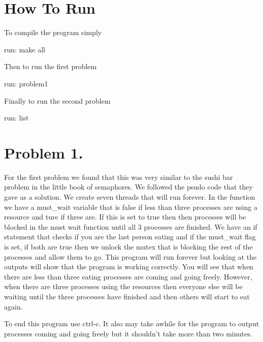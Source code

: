\documentclass[letterpaper,10pt,titlepage]{article}
\begin{document}
\section{How To Run} To compile the program simply 

run: make all

Then to run the first problem 

run: problem1

Finally to run the second problem 

run: list

\section{Problem 1.} For the first problem we found that this was very similar 
to the sushi bar problem in the little book of semaphores. We followed the 
psudo code that they gave as a solution. We create seven threads that will 
run forever. In the function we have a must\_wait variable that is false if 
less than three processes are using a resource and ture if three are. If this is set to 
true then then processes will be blocked in the must wait function until all 3 processes 
are finished. We have an if statement that checks if you are the last person 
eating and if the must\_wait flag is set, if both are true then we unlock the 
mutex that is blocking the rest of the processes and allow them to go. This 
program will run forever but looking at the outputs will show that the 
program is working correctly. You will see that when there are less than 
three eating processes are coming and going freely. However, when there 
are three processes using the resources then everyone else will be waiting 
until the three processes have finished and then others will start to eat again.

To end this program use ctrl-c. It also may take awhile for the program to 
output processes coming and going freely but it shouldn't take more than 
two minutes.
\end{document}
